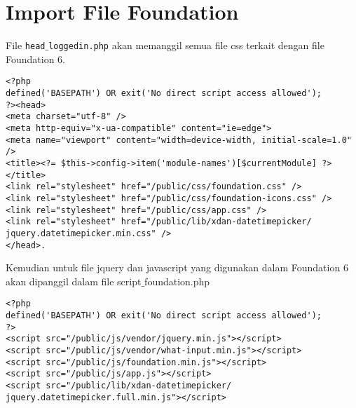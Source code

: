 \section{Import File Foundation}
File \texttt{head$\_$loggedin.php} akan memanggil semua file css terkait dengan file Foundation 6.
\begin{lstlisting}[frame=single, basicstyle=\small]
<?php
defined('BASEPATH') OR exit('No direct script access allowed');
?><head>
<meta charset="utf-8" />
<meta http-equiv="x-ua-compatible" content="ie=edge">
<meta name="viewport" content="width=device-width, initial-scale=1.0" />
<title><?= $this->config->item('module-names')[$currentModule] ?></title>
<link rel="stylesheet" href="/public/css/foundation.css" />
<link rel="stylesheet" href="/public/css/foundation-icons.css" />
<link rel="stylesheet" href="/public/css/app.css" />
<link rel="stylesheet" href="/public/lib/xdan-datetimepicker/
jquery.datetimepicker.min.css" />
</head>.
\end{lstlisting}
Kemudian untuk file jquery dan javascript yang digunakan dalam Foundation 6 akan dipanggil dalam file script$\_$foundation.php
\begin{lstlisting}[frame=single, basicstyle=\small]
<?php
defined('BASEPATH') OR exit('No direct script access allowed');
?>
<script src="/public/js/vendor/jquery.min.js"></script>
<script src="/public/js/vendor/what-input.min.js"></script>
<script src="/public/js/foundation.min.js"></script>
<script src="/public/js/app.js"></script>
<script src="/public/lib/xdan-datetimepicker/
jquery.datetimepicker.full.min.js"></script>
\end{lstlisting}

